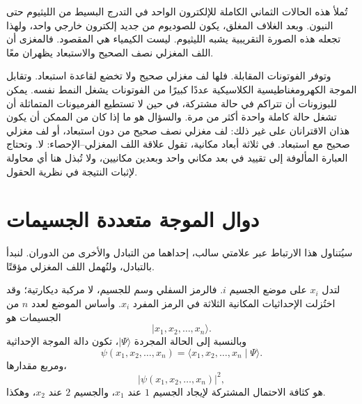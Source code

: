 تُملأ هذه الحالات الثماني الكاملة للإلكترون الواحد في التدرج البسيط من الليثيوم حتى النيون. وبعد الغلاف المغلق، يكون للصوديوم من جديد إلكترون خارجي واحد، ولهذا تجعله هذه الصورة التقريبية يشبه الليثيوم. ليست الكيمياء هي المقصود. فالمغزى أن اللف المغزلي نصف الصحيح والاستبعاد يظهران معًا.

وتوفر الفوتونات المقابلة. فلها لف مغزلي صحيح ولا تخضع لقاعدة استبعاد. وتقابل الموجة الكهرومغناطيسية الكلاسيكية عددًا كبيرًا من الفوتونات يشغل النمط نفسه. يمكن للبوزونات أن تتراكم في حالة مشتركة، في حين لا تستطيع الفرميونات المتماثلة أن تشغل حالة كاملة واحدة أكثر من مرة. والسؤال هو ما إذا كان من الممكن أن يكون هذان الاقترانان على غير ذلك: لف مغزلي نصف صحيح من دون استبعاد، أو لف مغزلي صحيح مع استبعاد. في ثلاثة أبعاد مكانية، تقول علاقة اللف المغزلي--الإحصاء: لا. وتحتاج العبارة المألوفة إلى تقييد في بعد مكاني واحد وبعدين مكانيين، ولا تُبذل هنا أي محاولة لإثبات النتيجة في نظرية الحقول.

\begin{classroomqa}
\end{classroomqa}

\section{دوال الموجة متعددة الجسيمات}

سيُتناول هذا الارتباط عبر علامتي سالب، إحداهما من التبادل والأخرى من الدوران. لنبدأ بالتبادل، ولنُهمل اللف المغزلي مؤقتًا.

لتدل \(x_i\) على موضع الجسيم \(i\). فالرمز السفلي وسم للجسيم، لا مركبة ديكارتية؛ وقد اختُزلت الإحداثيات المكانية الثلاثة في الرمز المفرد \(x_i\). وأساس الموضع لعدد \(n\) من الجسيمات هو
\begin{equation}
\lvert x_1,x_2,\ldots,x_n\rangle.
\end{equation}
وبالنسبة إلى الحالة المجردة \(\lvert\Psi\rangle\)، تكون دالة الموجة الإحداثية
\begin{equation}
\psi(x_1,x_2,\ldots,x_n)
=
\langle x_1,x_2,\ldots,x_n\mid\Psi\rangle.
\end{equation}
ومربع مقدارها،
\begin{equation}
\bigl\lvert\psi(x_1,x_2,\ldots,x_n)\bigr\rvert^2,
\end{equation}
هو كثافة الاحتمال المشتركة لإيجاد الجسيم \(1\) عند \(x_1\)، والجسيم \(2\) عند \(x_2\)، وهكذا.


